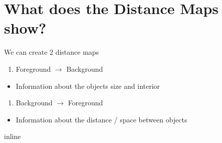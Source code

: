 \documentclass[letterpaper,10pt,english]{sphinxmanual}
\begin{document}
\section{What does the Distance Maps show?}
\label{\detokenize{06-AdvancedShapeAndTexture:what-does-the-distance-maps-show}}
\sphinxAtStartPar
We can create 2 distance maps
\begin{enumerate}
%
\item {} 
\sphinxAtStartPar
Foreground \(\rightarrow\) Background

\end{enumerate}
\begin{itemize}
\item {} 
\sphinxAtStartPar
Information about the objects size and interior

\end{itemize}
\begin{enumerate}
%
\item {} 
\sphinxAtStartPar
Background \(\rightarrow\) Foreground

\end{enumerate}
\begin{itemize}
\item {} 
\sphinxAtStartPar
Information about the distance / space between objects

\end{itemize}

\begin{sphinxVerbatim}[commandchars=\\\{\}]
 
   
   
   
 
   
 inline
\end{sphinxVerbatim}
\end{document}
